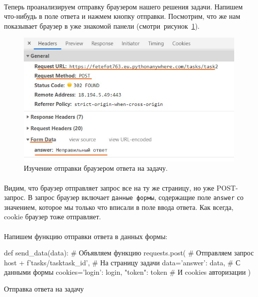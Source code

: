 \documentclass[12pt]{article}
\begin{document}
    \paragraph{}
    Теперь проанализируем отправку браузером нашего решения задачи.
    Напишем что-нибудь в поле ответа и нажмем кнопку отправки.
    Посмотрим, что же нам показывает браузер в уже знакомой панели (смотри~рисунок~\ref{fig:browser3}).

    \begin{figure}[H]
        \centering
        \includegraphics[width=15cm]{BrowserNetworkAnalysis3}
        \caption{Изучение отправки браузером ответа на задачу.}
        \label{fig:browser3}
    \end{figure}
    \paragraph{}
    Видим, что браузер отправляет запрос все на ту же страницу, но уже POST-запрос.
    В запрос браузер включает \verb|данные формы|, содержащие поле \verb|answer| со значением,
    которое мы только что вписали в поле ввода ответа.
    Как всегда, cookie браузер тоже отправляет.
    \paragraph{}
    Напишем функцию отправки ответа в данных формы:

    \begin{listing}[H]
        \begin{pythoncode}
def send_data(data):                              # Объявляем функцию
    requests.post(                                # Отправляем запрос
        host + f'tasks/task{task_id}',            # На страницу задачи
        data={'answer': data},                    # С данными формы
        cookies={'login': login, "token": token}  # И cookies авторизации
    )
        \end{pythoncode}
        \caption{Отправка ответа на задачу}
        \label{lst:send_data}
    \end{listing}
\end{document}
